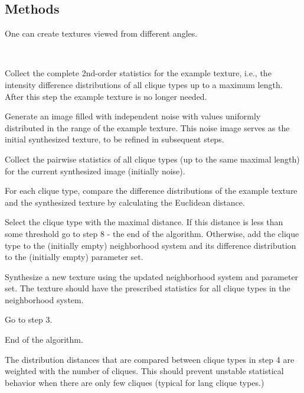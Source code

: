 \begin{compactdesc}
\subsection{Methods}
\item[\lp{View-dependent texture synthesis}] One can create textures viewed from different angles.
\item[\lp{Clique Type Selection}]\hfill\\
	\begin{enumerate*}[label=\lp{step \arabic*},itemjoin=]
		\item  Collect the complete 2nd-order statistics for the example texture, i.e., the intensity difference distributions of all clique types up to a maximum length.  After this step the example texture is no longer needed.\\
		\item Generate an image filled with independent noise with values uniformly distributed in the range of the example texture. This noise image serves as the initial synthesized texture, to be refined in subsequent steps.\\
		\item Collect the pairwise statistics of all clique types (up to the same maximal length) for the current synthesized image (initially noise).\\
		\item For each clique type, compare the difference distributions of the example texture and the synthesized texture by calculating the Euclidean distance.\\
		\item Select the clique type with the maximal distance. If this distance is less than some threshold go to step 8 - the end of the algorithm. Otherwise, add the clique type to the (initially empty) neighborhood system and its difference distribution to the (initially empty) parameter set.\\
		\item Synthesize a new texture using the updated neighborhood system and parameter set. The texture should have the prescribed statistics for all clique types in the neighborhood system.\\
		\item Go to step 3.\\
		\item End of the algorithm.\\
	\end{enumerate*}
	The distribution distances that are compared between clique types in step 4 are weighted with the number of cliques. This should prevent unstable statistical behavior when there are only few cliques (typical for lang clique types.)

\end{compactdesc}
